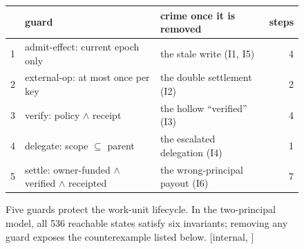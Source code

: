 \begin{figure}[H]
\medskip
{\pdcaptionface\footnotesize
\begin{tabularx}{\linewidth}{@{}c >{\raggedright\arraybackslash}X >{\raggedright\arraybackslash}X r@{}}
\toprule
 & guard & crime once it is removed & steps \\
\midrule
1 & admit-effect: current epoch only & the stale write (I1, I5) & 4 \\
2 & external-op: at most once per key & the double settlement (I2) & 2 \\
3 & verify: policy $\wedge$ receipt & the hollow ``verified'' (I3) & 4 \\
4 & delegate: scope $\subseteq$ parent & the escalated delegation (I4) & 1 \\
5 & settle: owner-funded $\wedge$ verified $\wedge$ receipted & the wrong-principal payout (I6) & 7 \\
\bottomrule
\end{tabularx}}
\caption{Five guards protect the work-unit lifecycle. In the two-principal
model, all 536 reachable states satisfy six invariants; removing any guard
exposes the counterexample listed below. [internal,
\protect{}]}
\label{fig:swk-workunit-machine}
\end{figure}
